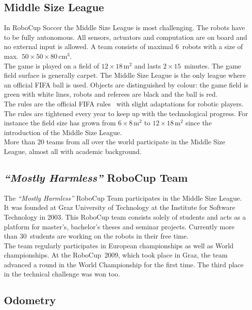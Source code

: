 \documentclass[12pt,a4paper]{article}
\newcommand{\MH}{\emph{``Mostly Harmless''} RoboCup Team\xspace}
\newcommand{\MSL}{Middle Size League\xspace}
\begin{document}

\subsection{\MSL}

In RoboCup Soccer the \MSL is most challenging.
The robots have to be fully autonomous.
All sensors, actuators and computation are on board and no external input is allowed.
A team consists of maximal 6~robots with a size of max.\ $50\times50\times80$\,cm$^3$.\\
The game is played on a field of $12\times18$\,m$^2$ and lasts $2\times15$~minutes.
The game field surface is generally carpet.
The \MSL is the only league where an official FIFA ball is used.
Objects are distinguished by colour: the game field is green with white lines, robots and referees are black and the ball is red.\\
The rules are the official FIFA rules~\cite{msl-rules} with slight adaptations for robotic players.
The rules are tightened every year to keep up with the technological progress. 
For instance the field size has grown from $6\times8$\,m$^2$ to $12\times18$\,m$^2$ since the introduction of the \MSL.\\
More than 20 teams from all over the world participate in the \MSL, almost all with academic background.


\subsection{\MH}

The \MH participates in the \MSL. 
It was founded at Graz University of Technology at the Institute for Software Technology in 2003. 
This RoboCup team consists solely of students and acts as a platform for master's, bachelor's theses and seminar projects.
Currently more than 30~students are working on the robots in their free time.\\
The team regularly participates in European championships as well as World championships.
At the RoboCup~2009, which took place in Graz, the team advanced a round in the World Championship for the first time.
The third place in the technical challenge was won too.



\subsection{Odometry}
\end{document}
